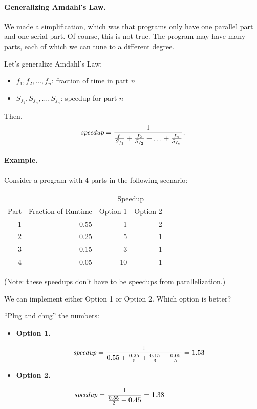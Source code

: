 \documentclass[a4paper]{report}
\begin{document}
\paragraph{Generalizing Amdahl's Law.} We made a simplification,
which was that programs only have one parallel part and one serial part.
Of course, this is not true. The program may have many parts,
 each of which we can tune to a different degree.

Let's generalize Amdahl's Law:

\begin{itemize}
\item  $f_1, f_2, \ldots, f_n$: fraction of time in part $n$
\item  $S_{f_1}, S_{f_n}, \ldots, S_{f_n}$: speedup for part $n$
\end{itemize}

Then,
\[\mbox{\em speedup} = \frac{1}{\frac{f_1}{S_{f_1}} + \frac{f_2}{S_{f_2}} + \ldots +
     \frac{f_n}{S_{f_n}}}.\]

\paragraph{Example.} Consider a program with 4 parts in the following scenario:

\begin{center}
     \begin{tabular}{r|r|r|r}
     \multicolumn{2}{l}{} & \multicolumn{2}{|c}{Speedup} \\
     Part & Fraction of Runtime & Option 1 & Option 2\\
     \hline
     1 & 0.55 & 1  & 2\\
     2 & 0.25 & 5  & 1\\
     3 & 0.15 & 3  & 1\\
     4 & 0.05  & 10 & 1\\
     \end{tabular}
 \end{center}

     (Note: these speedups don't have to be speedups from parallelization.)
    
   We can implement either Option 1 or Option 2. 
   Which option is better?

   ``Plug and chug'' the numbers:
 \begin{itemize}
 \item  {\bf Option 1.}

   \[ \mbox{\em speedup} = \frac{1}{0.55 + \frac{0.25}{5} + \frac{0.15}{3} + \frac{0.05}{5}}
     = 1.53  \]

 \item  {\bf Option 2.}

   \[\mbox{\em speedup} = \frac{1}{\frac{0.55}{2} + 0.45} = 1.38 \hspace*{5.5em}\]
\end{itemize}
\end{document}
